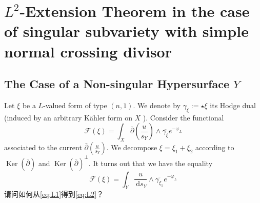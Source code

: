 \chapter{\texorpdfstring{$L^2$}{}-Extension Theorem in the case of singular subvariety with simple normal crossing divisor}
\section{The Case of a Non-singular Hypersurface \texorpdfstring{$Y$}{}}
\begin{problem}\label{prob:cp1}
    Let $\xi$ be a $L$-valued form of type $(n, 1)$. We denote by $\gamma_{\xi}:=\star \xi$ its Hodge dual (induced by an arbitrary Kähler form on $X$ ).
Consider the functional
\begin{equation}
    \label{eq:L1}
    \mathcal{F}(\xi)=\int_X \bar{\partial}\left(\frac{u}{s_Y}\right) \wedge \overline{\gamma_{\xi}} e^{-\varphi_L} 
\end{equation}
associated to the current $\bar{\partial}\left(\frac{u}{s_Y}\right)$.
We decompose $\xi=\xi_1+\xi_2$ according to $\operatorname{Ker}(\bar{\partial})$ and $\operatorname{Ker}(\bar{\partial})^{\perp}$. It turns out that we have the equality
\begin{equation}
    \label{eq:L2}
    \mathcal{F}(\xi)=\int_Y \frac{u}{\mathrm{~d} s_Y} \wedge \overline{\gamma_{\xi_1}} e^{-\varphi_L}
\end{equation}
请问如何从\eqref{eq:L1}得到\eqref{eq:L2}？
\end{problem}
    
